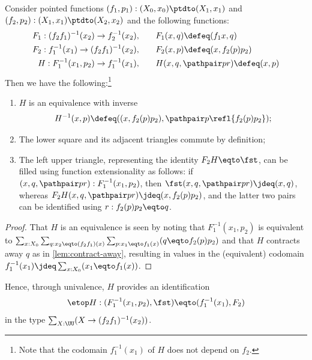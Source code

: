 \begin{lemma}
  \label{lem:fibersofcomposites}
  Consider pointed functions $(f_1,p_1):(X_0,x_0)\ptdto (X_1,x_1)$ and $(f_2,p_2):(X_1,x_1)\ptdto (X_2,x_2)$ and the following functions:
\begin{align*}
  F_1:(f_2f_1)^{-1}(x_2)\to f_2^{-1}(x_2),\qquad &F_1(x,q)\defeq(f_1x,q)\\
  F_2:f_1^{-1}(x_1)\to(f_2f_1)^{-1}(x_2),\qquad &F_2(x,p)\defeq(x,f_2(p)p_2)\\
  H:F_1^{-1}(x_1,p_2)%
  \to f_1^{-1}(x_1),\qquad &H(x,q,\pathpair p r)\defeq (x,p)
\end{align*}
Then we have the following:\footnote{%
Note that the codomain $f_1^{-1}(x_1)$ of $H$ does not depend on $f_2$.} 
\begin{enumerate}
\item $H$ is an equivalence with inverse
$$H^{-1}(x,p)\defeq((x,f_2(p)p_2),\pathpair p {\refl{f_2(p)p_2}});$$
\item The lower square and its adjacent triangles commute by definition;
\item The left upper triangle, representing the identity
$F_2H \eqto\fst$, can be filled using function extensionality as follows:
if $(x,q,\pathpair p r):F_1^{-1}(x_1,p_2)$, then $\fst(x,q,\pathpair p r)\jdeq (x,q)$, whereas $F_2H(x,q,\pathpair p r)\jdeq(x,f_2(p)p_2)$, and the latter
two pairs can be identified using $r:f_2(p)p_2\eqto q$.
\end{enumerate}
\end{lemma}
\begin{proof}
  That $H$ is an equivalence is seen by noting that $F_1^{-1}(x_1,p_2)$ 
  is equivalent to $\sum_{x:X_0}\sum_{q:x_2\eqto (f_2f_1)(x)}\sum_{p:x_1\eqto f_1(x)} (q\eqto f_2(p)p_2)$ and that $H$ contracts away $q$ as in \cref{lem:contract-away}, resulting in values in the (equivalent) 
  codomain $f_1^{-1}(x_1)\jdeq\sum_{x:X_0}(x_1\eqto f_1(x))$.
\end{proof}

Hence, through univalence, $H$ provides an identification
  $$\etop H:(F_1^{-1}(x_1,p_2),\fst)\eqto (f_1^{-1}(x_1),F_2)$$ in the type $\sum_{X:\UU}(X\to(f_2f_1)^{-1}(x_2))$.
  
